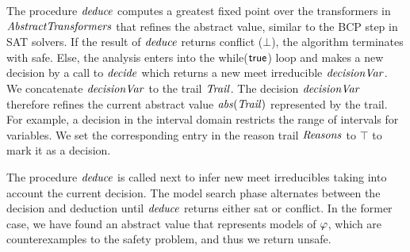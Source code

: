The procedure $\mathit{deduce}$ computes a greatest fixed point over the
transformers in $\mathit{AbstractTransformers}$ that refines the abstract value,
similar to the BCP step in SAT solvers.  If the result of $\mathit{deduce}$
returns \textsf{conflict} ($\bot$), the algorithm terminates with
\textsf{safe}.  Else, the analysis enters into the while($\mathsf{true}$) loop
and makes a new decision by a call to $\mathit{decide}$ which returns a new
meet irreducible $\mathit{decisionVar}$.
%
%
We concatenate $\mathit{decisionVar}$ to the
trail $\mathit{Trail}$.  The decision $\mathit{decisionVar}$ therefore refines the current
abstract value $\mathit{abs}(\mathit{Trail})$ represented by the trail.
%
For example, a decision in the interval domain restricts the range of 
intervals for variables.
%
We set the corresponding entry in the reason trail $\mathit{Reasons}$ to $\top$
to mark it as a decision.

The procedure $\mathit{deduce}$ is called next to infer new meet irreducibles
taking into account the current decision.  The model search phase
alternates between the decision and deduction until $\mathit{deduce}$ returns
either \textsf{sat} or \textsf{conflict}.  In the former case, we have
found an abstract value that represents models of $\varphi$, which
are counterexamples to the safety problem, and thus we return
\textsf{unsafe}.
%

